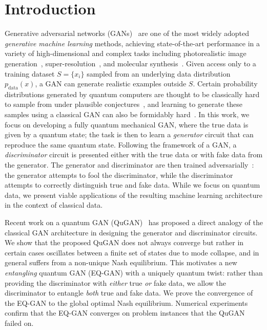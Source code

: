 \documentclass[prl,superscriptaddress,twocolumn]{revtex4}
\theoremstyle{plain}
\theoremstyle{definition}
\begin{document}
\section{Introduction}%
Generative adversarial networks (GANs)~\cite{goodfellow2014generative} are one of the most widely adopted \emph{generative machine learning} methods, achieving state-of-the-art performance in a variety of high-dimensional and complex tasks including photorealistic image generation~\cite{NIPS2016_8a3363ab}, super-resolution~\cite{Ledig_2017_CVPR}, and molecular synthesis~\cite{molecule}. Given access only to a training dataset $S = \{x_i\}$ sampled from an underlying data distribution $p_\mathrm{data}(x)$, a GAN can generate realistic examples outside $S$. Certain probability distributions generated by   quantum computers are thought to be classically hard to sample from under plausible conjectures~\cite{boixo2016characterizing,bosonsampling,supremacy2019}, and learning to generate these samples using a classical GAN can also be formidably hard~\cite{niu2020learnability}. In this work, we focus on developing a fully quantum mechanical GAN, where the true data is given by a quantum state; the task is then to learn a \emph{generator} circuit that can reproduce the same quantum state. Following the framework of a GAN, a \emph{discriminator} circuit is presented either with the true data or with fake data from the generator. The generator and discriminator are then trained adversarially~\cite{szegedy2013intriguing}: the generator attempts to fool the discriminator, while the discriminator attempts to correctly distinguish true and fake data. While we focus on quantum data, we present viable applications of the resulting machine learning architecture in the context of classical data.

Recent work on a quantum GAN (QuGAN)~\cite{PhysRevA.98.012324,Lloyd2018} has proposed a direct analogy of the classical GAN architecture in designing the generator and discriminator circuits. We show that the proposed QuGAN does not always converge but rather in certain cases oscillates between a finite set of states due to mode collapse, and in general suffers from a non-unique Nash equilibrium.
This motivates a new \emph{entangling} quantum GAN (EQ-GAN) with a uniquely quantum twist: rather than providing the discriminator with \emph{either} true \emph{or} fake data, we allow the discriminator to entangle \emph{both} true and fake data. We prove the convergence of the EQ-GAN to the global optimal Nash equilibrium. Numerical experiments confirm that the EQ-GAN converges on problem instances that the QuGAN failed on.
\end{document}
